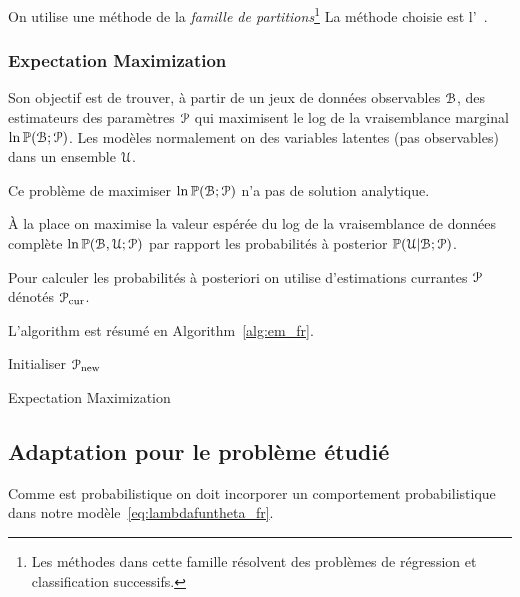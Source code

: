 \documentclass[../main.tex]{subfiles}
\begin{document}
On utilise une méthode de la \emph{famille de partitions}\footnote{Les méthodes dans cette famille résolvent des problèmes de régression et classification successifs.}
La méthode choisie est l'\EM{}~\cite{DempsterEtAl1977,Bishop2006}.

\subsubsection{Expectation Maximization}
Son objectif est de trouver, à partir de un jeux de données observables $\mathcal{B}$, des estimateurs des paramètres $\mathcal{P}$ qui maximisent le log de la vraisemblance marginal ${\ln\mathbb{P}(\mathcal{B};\mathcal{P})}$.
Les modèles normalement on des variables latentes (pas observables) dans un ensemble $\mathcal{U}$.

Ce problème de maximiser ${\ln\mathbb{P}(\mathcal{B};\mathcal{P})}$ n'a pas de solution analytique.

À la place on maximise la valeur espérée du log de la vraisemblance de données complète $\ln\mathbb{P}(\mathcal{B},\mathcal{U};\mathcal{P})$ par rapport les probabilités à posterior ${\mathbb{P}(\mathcal{U}|\mathcal{B};\mathcal{P})}$.

Pour calculer les probabilités à posteriori on utilise d'estimations currantes $\mathcal{P}$ dénotés $\mathcal{P}_{\mathrm{cur}}$.

L'algorithm est résumé en Algorithm~\ref{alg:em_fr}.

\begin{algorithm2e}[h]
  \DontPrintSemicolon%
  Initialiser $\mathcal{P}_{\mathrm{new}}$\;
 \caption{Expectation Maximization}\label{alg:em_fr}
\end{algorithm2e}

\subsection{Adaptation pour le problème étudié}
Comme \EM{} est probabilistique on doit incorporer un comportement probabilistique dans notre modèle~\eqref{eq:lambdafuntheta_fr}.
\end{document}
